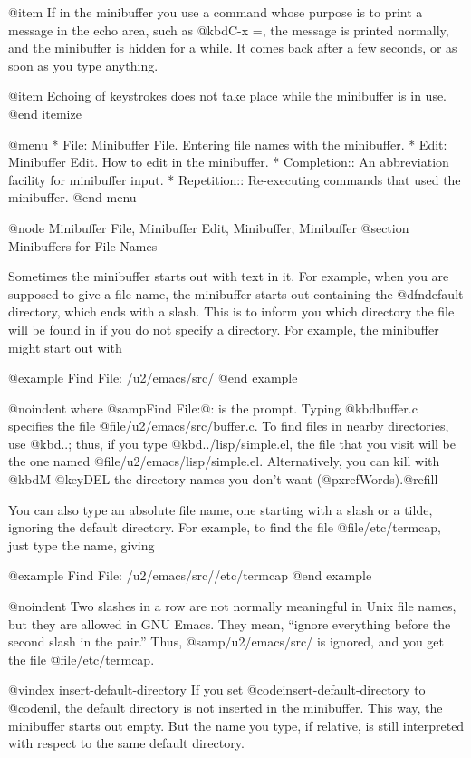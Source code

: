 {{{{{{@item
If in the minibuffer you use a command whose purpose is to print a
message in the echo area, such as @kbd{C-x =}, the message is printed
normally, and the minibuffer is hidden for a while.  It comes back
after a few seconds, or as soon as you type anything.

@item
Echoing of keystrokes does not take place while the minibuffer is in
use.
@end itemize

@menu
* File: Minibuffer File.  Entering file names with the minibuffer.
* Edit: Minibuffer Edit.  How to edit in the minibuffer.
* Completion::		  An abbreviation facility for minibuffer input.
* Repetition::		  Re-executing commands that used the minibuffer.
@end menu

@node Minibuffer File, Minibuffer Edit, Minibuffer, Minibuffer
@section Minibuffers for File Names

  Sometimes the minibuffer starts out with text in it.  For example, when
you are supposed to give a file name, the minibuffer starts out containing
the @dfn{default directory}, which ends with a slash.  This is to inform
you which directory the file will be found in if you do not specify a
directory.  For example, the minibuffer might start out with

@example
Find File: /u2/emacs/src/
@end example

@noindent
where @samp{Find File:@: } is the prompt.  Typing @kbd{buffer.c} specifies
the file @file{/u2/emacs/src/buffer.c}.  To find files in nearby
directories, use @kbd{..}; thus, if you type @kbd{../lisp/simple.el}, the
file that you visit will be the one named @file{/u2/emacs/lisp/simple.el}.
Alternatively, you can kill with @kbd{M-@key{DEL}} the directory names you
don't want (@pxref{Words}).@refill

  You can also type an absolute file name, one starting with a slash or a
tilde, ignoring the default directory.  For example, to find the file
@file{/etc/termcap}, just type the name, giving

@example
Find File: /u2/emacs/src//etc/termcap
@end example

@noindent
Two slashes in a row are not normally meaningful in Unix file names, but
they are allowed in GNU Emacs.  They mean, ``ignore everything before the
second slash in the pair.''  Thus, @samp{/u2/emacs/src/} is ignored, and
you get the file @file{/etc/termcap}.

@vindex insert-default-directory
  If you set @code{insert-default-directory} to @code{nil}, the default directory
is not inserted in the minibuffer.  This way, the minibuffer starts out
empty.  But the name you type, if relative, is still interpreted with
respect to the same default directory.

}}}}}}

